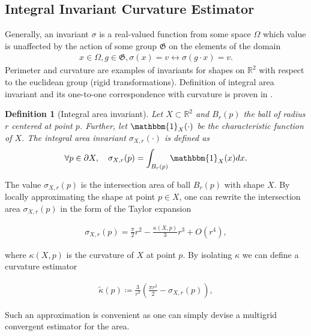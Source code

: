 \documentclass[runningheads]{llncs}
\newtheorem{ddef}{Definition}
\begin{document}
\subsection{Integral Invariant Curvature Estimator}
Generally, an invariant $\sigma$ is a real-valued function from some space $\Omega$ which value is unaffected by the action
of some group $\mathfrak{G}$ on the elements of the domain
\begin{align*}
  x \in \Omega, g \in \mathfrak{G}, \sigma(x) = v \longleftrightarrow \sigma(g \cdot x ) = v.
\end{align*}
Perimeter and curvature are examples of invariants for shapes on $\mathbb{R}^2$ with respect to the euclidean group
(rigid transformations). Definition of integral area invariant and its one-to-one correspondence with curvature is
proven in \cite{manay04}.


\begin{ddef}[Integral area invariant]
  Let $X \subset \mathbb{R}^2$ and $B_r(p)$ the ball of radius $r$ centered at point $p$. Further, let
  $\mathbbm{1}_X(\cdot)$ be the characteristic function of $X$. The integral area invariant $\sigma_{X,r}(\cdot)$ is
  defined as
  \begin{align*}
    \forall p \in \partial X, \quad \sigma_{X,r}(p) = \int_{B_r(p)}{ \mathbbm{1}_X(x) dx}.
  \end{align*}
\end{ddef}


The value $\sigma_{X,r}(p)$ is the intersection area of ball $B_r(p)$ with shape $X$. By locally approximating the shape
at point $p \in X$, one can rewrite the intersection area $\sigma_{X,r}(p)$ in the form of the Taylor expansion
\cite{pottman09}
	
\begin{align*}
  \sigma_{X,r}(p) = \frac{\pi}{2}r^2 - \frac{\kappa(X,p)}{3}r^3 + O(r^4),
\end{align*}
		
where $\kappa(X,p)$ is the curvature of $X$ at point $p$. By isolating $\kappa$ we can define a curvature estimator
	
\begin{align}
  \tilde{\kappa}(p) \coloneqq \frac{3}{r^3}\left( \frac{\pi r^2}{2} - \sigma_{X,r}(p) \right),
  \label{eq:curvature_approximation}
\end{align}
	
Such an approximation is convenient as one can simply devise a multigrid convergent estimator for the area.
\end{document}
